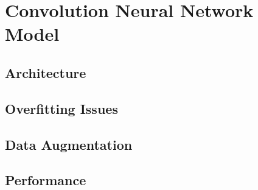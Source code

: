 \chapter{Convolution Neural Network Model}
\label{chap:cnn}

\section{Architecture}

\section{Overfitting Issues}

\section{Data Augmentation}

\section{Performance}

